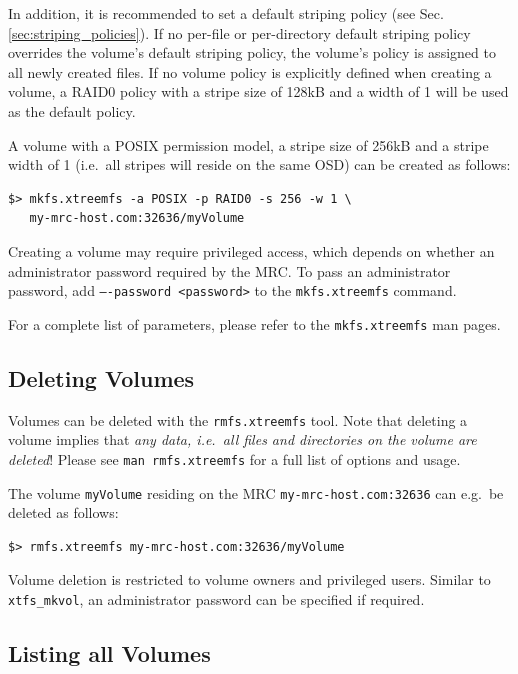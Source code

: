 \documentclass[a4paper,10pt]{book}
\begin{document}
In addition, it is recommended to set a default striping policy (see Sec. \ref{sec:striping_policies}). If no per-file or per-directory default striping policy overrides the volume's default striping policy, the volume's policy is assigned to all newly created files. If no volume policy is explicitly defined when creating a volume, a RAID0 policy with a stripe size of 128kB and a width of 1 will be used as the default policy.

A volume with a POSIX permission model, a stripe size of 256kB and a stripe width of 1 (i.e.\ all stripes will reside on the same OSD) can be created as follows:


\begin{verbatim}
$> mkfs.xtreemfs -a POSIX -p RAID0 -s 256 -w 1 \
   my-mrc-host.com:32636/myVolume
\end{verbatim}

Creating a volume may require privileged access, which depends on whether an administrator password required by the MRC. To pass an administrator password, add \texttt{----password <password>} to the \texttt{mkfs.xtreemfs} command.

For a complete list of parameters, please refer to the \texttt{mkfs.xtreemfs} man pages.

\subsection{Deleting Volumes}

Volumes can be deleted with the \texttt{rmfs.xtreemfs} tool. Note that deleting a volume implies that \emph{any data, i.e.\ all files and directories on the volume are deleted}! Please see \texttt{man rmfs.xtreemfs} for a full list of options and usage.

The volume \texttt{myVolume} residing on the MRC \texttt{my-mrc-host.com:32636} can e.g.\ be deleted as follows:

\begin{verbatim}
$> rmfs.xtreemfs my-mrc-host.com:32636/myVolume
\end{verbatim}

Volume deletion is restricted to volume owners and privileged users. Similar to \texttt{xtfs\_mkvol}, an administrator password can be specified if required.

\subsection{Listing all Volumes}
\end{document}
